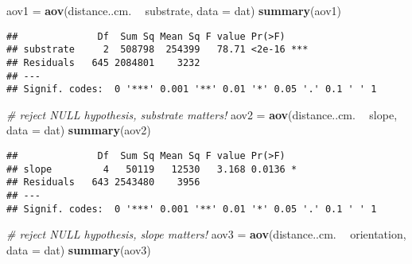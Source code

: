 \documentclass[]{article}
\newenvironment{Shaded}{\begin{snugshade}}{\end{snugshade}}
\newcommand{\CommentTok}[1]{\textcolor[rgb]{0.56,0.35,0.01}{\textit{#1}}}
\newcommand{\DataTypeTok}[1]{\textcolor[rgb]{0.13,0.29,0.53}{#1}}
\newcommand{\KeywordTok}[1]{\textcolor[rgb]{0.13,0.29,0.53}{\textbf{#1}}}
\newcommand{\NormalTok}[1]{#1}
\newcommand{\OperatorTok}[1]{\textcolor[rgb]{0.81,0.36,0.00}{\textbf{#1}}}
\newcommand{\OtherTok}[1]{\textcolor[rgb]{0.56,0.35,0.01}{#1}}
\newcommand{\StringTok}[1]{\textcolor[rgb]{0.31,0.60,0.02}{#1}}
\begin{document}
\begin{Shaded}
\end{Shaded}

\begin{Shaded}
\begin{Highlighting}[]
\NormalTok{aov1 =}\StringTok{ }\KeywordTok{aov}\NormalTok{(distance..cm. }\OperatorTok{~}\StringTok{ }\NormalTok{substrate, }\DataTypeTok{data =}\NormalTok{ dat)}
\KeywordTok{summary}\NormalTok{(aov1)}
\end{Highlighting}
\end{Shaded}

\begin{verbatim}
##              Df  Sum Sq Mean Sq F value Pr(>F)    
## substrate     2  508798  254399   78.71 <2e-16 ***
## Residuals   645 2084801    3232                   
## ---
## Signif. codes:  0 '***' 0.001 '**' 0.01 '*' 0.05 '.' 0.1 ' ' 1
\end{verbatim}

\begin{Shaded}
\begin{Highlighting}[]
\CommentTok{# reject NULL hypothesis, substrate matters!}
\NormalTok{aov2 =}\StringTok{ }\KeywordTok{aov}\NormalTok{(distance..cm. }\OperatorTok{~}\StringTok{ }\NormalTok{slope, }\DataTypeTok{data =}\NormalTok{ dat)}
\KeywordTok{summary}\NormalTok{(aov2)}
\end{Highlighting}
\end{Shaded}

\begin{verbatim}
##              Df  Sum Sq Mean Sq F value Pr(>F)  
## slope         4   50119   12530   3.168 0.0136 *
## Residuals   643 2543480    3956                 
## ---
## Signif. codes:  0 '***' 0.001 '**' 0.01 '*' 0.05 '.' 0.1 ' ' 1
\end{verbatim}

\begin{Shaded}
\begin{Highlighting}[]
\CommentTok{# reject NULL hypothesis, slope matters!}
\NormalTok{aov3 =}\StringTok{ }\KeywordTok{aov}\NormalTok{(distance..cm. }\OperatorTok{~}\StringTok{ }\NormalTok{orientation, }\DataTypeTok{data =}\NormalTok{ dat)}
\KeywordTok{summary}\NormalTok{(aov3)}
\end{Highlighting}
\end{Shaded}
\end{document}
